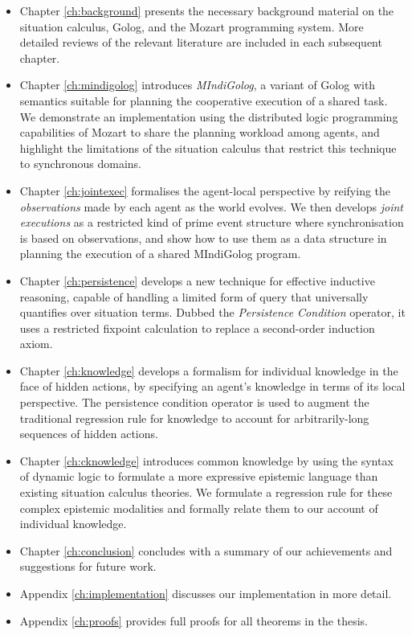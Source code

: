 \begin{itemize}
\item Chapter \ref{ch:background} presents the necessary background material
on the situation calculus, Golog, and the Mozart programming system.
More detailed reviews of the relevant literature are included in each
subsequent chapter. 
\item Chapter \ref{ch:mindigolog} introduces \emph{MIndiGolog}, a variant
of Golog with semantics suitable for planning the cooperative execution
of a shared task\emph{.} We demonstrate an implementation using the
distributed logic programming capabilities of Mozart to share the
planning workload among agents, and highlight the limitations of the
situation calculus that restrict this technique to synchronous domains. 
\item Chapter \ref{ch:jointexec} formalises the agent-local perspective
by reifying the \emph{observations} made by each agent as the world
evolves. We then develops \emph{joint executions} as a restricted
kind of prime event structure where synchronisation is based on observations,
and show how to use them as a data structure in planning the execution
of a shared MIndiGolog program. 
\item Chapter \ref{ch:persistence} develops a new technique for effective
inductive reasoning, capable of handling a limited form of query that
universally quantifies over situation terms. Dubbed the \emph{Persistence
Condition} operator, it uses a restricted fixpoint calculation to
replace a second-order induction axiom. 
\item Chapter \ref{ch:knowledge} develops a formalism for individual knowledge
in the face of hidden actions, by specifying an agent's knowledge
in terms of its local perspective. The persistence condition operator
is used to augment the traditional regression rule for knowledge to
account for arbitrarily-long sequences of hidden actions. 
\item Chapter \ref{ch:cknowledge} introduces common knowledge by using
the syntax of dynamic logic to formulate a more expressive epistemic
language than existing situation calculus theories. We formulate a
regression rule for these complex epistemic modalities and formally
relate them to our account of individual knowledge. 
\item Chapter \ref{ch:conclusion} concludes with a summary of our achievements
and suggestions for future work. 
\item Appendix \ref{ch:implementation} discusses our implementation in
more detail. 
\item Appendix \ref{ch:proofs} provides full proofs for all theorems in
the thesis. 
\end{itemize}
